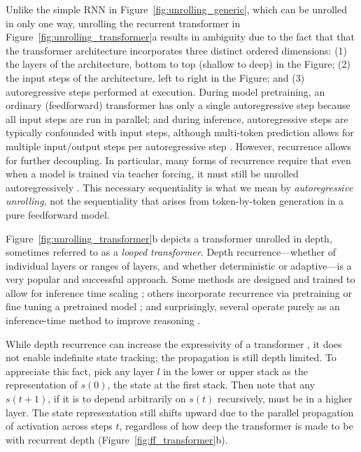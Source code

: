 \documentclass{llmxive}
\begin{document}
Unlike the simple RNN in Figure~\ref{fig:unrolling_generic}, which can be unrolled 
in only one way, unrolling the recurrent transformer in 
Figure~\ref{fig:unrolling_transformer}a  results in ambiguity
due to the fact that that the transformer
architecture incorporates three distinct ordered dimensions:
(1) the layers of the architecture, bottom to top (shallow to deep) in the Figure;
(2) the input steps of the architecture, left to right in the Figure; and
(3) autoregressive steps performed at execution. During model pretraining,
an ordinary (feedforward) transformer has only a single autoregressive step 
because all input steps are run in parallel; and during inference, autoregressive
steps are typically confounded with input steps, although multi-token prediction
allows for multiple input/output steps per autoregressive step \citep{gloeckle2024better}.
However,
recurrence allows for further decoupling. In particular, many forms of
recurrence require that even when a model is trained via teacher forcing,
it must still be unrolled autoregressively \citep{teoh2025next}. This necessary sequentiality is
what we mean by \emph{autoregressive unrolling}, not
the sequentiality that arises from token-by-token generation in a pure feedforward model.

Figure~\ref{fig:unrolling_transformer}b depicts a transformer unrolled in
depth, sometimes referred to as a \emph{looped transformer}. 
Depth recurrence---whether
of individual layers or ranges of layers, and whether deterministic or adaptive---is 
a very popular and successful approach.
Some methods are designed and trained to allow for inference time scaling
\citep[e.g.,][]{yang2024,nowak2024,raposo2024,alabdulmohsin2025recursive,bae2025,chen2025,geiping2025,rodkin2025,yu2025backattn,zhu2025,zeng2026ponderlm,jeddi2026loopformer}; others incorporate recurrence via pretraining \citep{sanyal2026} or fine tuning a pretrained model \citep{koishekenov2025,mcleish2025}; and surprisingly, several operate purely as an
inference-time method to improve reasoning
\citep{li2025skiplayerloopit,chen2026,ng2026rys}.

While depth recurrence can increase the expressivity of a 
transformer \citep{saunshi2025}, it does not enable indefinite state tracking;
the propagation is still depth limited. To appreciate this fact, pick any layer $l$
in the lower or upper stack as the representation of $s(0)$, the state at the 
first stack. Then note that any $s(t+1)$, if it is to depend arbitrarily on 
$s(t)$ recursively, must be in a higher layer. The state representation still
shifts upward due to the parallel propagation of activation across steps $t$,
regardless of how deep the transformer is made to be with recurrent depth (Figure~\ref{fig:ff_transformer}b).
\end{document}

